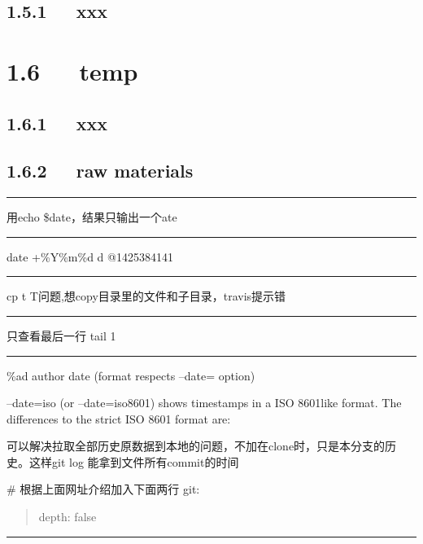 \documentclass[letterpaper,12pt,english]{sphinxmanual}
\begin{document}
\subsection{1.5.1   xxx}
\label{\detokenize{000misc/memo:id5}}

\section{1.6   temp}
\label{\detokenize{000misc/memo:temp}}

\subsection{1.6.1   xxx}
\label{\detokenize{000misc/memo:id6}}

\subsection{1.6.2   raw materials}
\label{\detokenize{000misc/memo:raw-materials}}

\bigskip\hrule\bigskip


用echo \$date，结果只输出一个ate


\bigskip\hrule\bigskip


date +\%Y\%m\%d \sphinxhyphen{}d @1425384141


\bigskip\hrule\bigskip


cp \sphinxhyphen{}t \sphinxhyphen{}T问题,想copy目录里的文件和子目录，travis提示错


\bigskip\hrule\bigskip


只查看最后一行
tail \sphinxhyphen{}1


\bigskip\hrule\bigskip


\%ad
author date (format respects –date= option)

–date=iso (or –date=iso8601) shows timestamps in a ISO 8601\sphinxhyphen{}like format. The differences to the strict ISO 8601 format are:

可以解决拉取全部历史原数据到本地的问题，不加在clone时，只是本分支的历史。这样git log 能拿到文件所有commit的时间

\# 根据上面网址介绍加入下面两行
git:
\begin{quote}

depth: false
\end{quote}


\bigskip\hrule\bigskip


\end{document}
